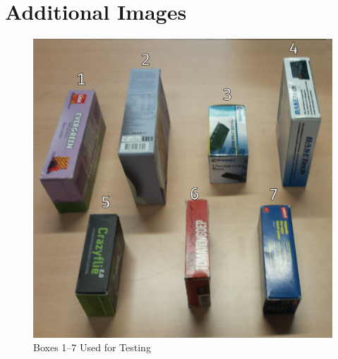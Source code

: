 \documentclass[letterpaper, 10 pt, conference]{conf/ieeeconf}  %
\begin{document}
\appendix 
\section*{Additional Images}
\begin{figure}[H]
  \centering
  \includegraphics[width=0.9\linewidth]{test_boxes.png}
  \caption{\label{fig:test_boxes} Boxes 1--7 Used for Testing}
\end{figure}
\end{document}
